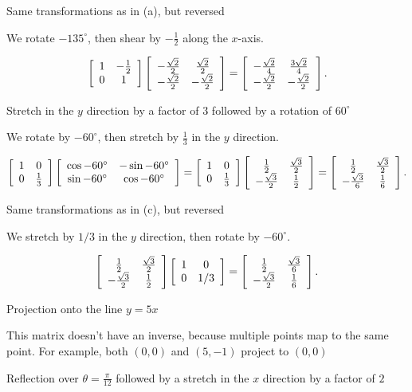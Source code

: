 \documentclass[../key.tex]{subfiles}
\begin{document}
\begin{inner_problem}
\item Same transformations as in (a), but reversed
\end{inner_problem}

We rotate $-135^\circ$, then shear by $-\frac{1}{2}$ along the $x$-axis.

$$\left[\begin{array}{cc} 1 & -\frac{1}{2} \\ 0 & 1 \end{array}\right]\left[\begin{array}{cc} -\frac{\sqrt{2}}{2} & \frac{\sqrt{2}}{2} \\ -\frac{\sqrt{2}}{2} & -\frac{\sqrt{2}}{2} \end{array}\right] = \left[\begin{array}{cc} -\frac{\sqrt{2}}{4} & \frac{3\sqrt{2}}{4} \\ -\frac{\sqrt{2}}{2} & -\frac{\sqrt{2}}{2} \end{array}\right].$$

\begin{inner_problem}
\item Stretch in the $y$ direction by a factor of $3$ followed by a rotation of $60^\circ$
\end{inner_problem}

We rotate by $-60^\circ$, then stretch by $\frac{1}{3}$ in the $y$ direction.

$$\left[\begin{array}{cc} 1 & 0 \\ 0 & \frac{1}{3} \end{array}\right]\left[\begin{array}{cc} \cos -60^\circ & -\sin -60^\circ \\ \sin -60^\circ & \cos -60^\circ \end{array}\right] = \left[\begin{array}{cc} 1 & 0 \\ 0 & \frac{1}{3} \end{array}\right]\left[\begin{array}{cc} \frac{1}{2} & \frac{\sqrt{3}}{2} \\ -\frac{\sqrt{3}}{2} & \frac{1}{2} \end{array}\right] = \left[\begin{array}{cc} \frac{1}{2} & \frac{\sqrt{3}}{2} \\ -\frac{\sqrt{3}}{6} & \frac{1}{6} \end{array}\right].$$

\begin{inner_problem}
\item Same transformations as in (c), but reversed
\end{inner_problem}

We stretch by $1/3$ in the $y$ direction, then rotate by $-60^\circ$.

$$\left[\begin{array}{cc} \frac{1}{2} & \frac{\sqrt{3}}{2} \\ -\frac{\sqrt{3}}{2} & \frac{1}{2} \end{array}\right]\left[\begin{array}{cc} 1 & 0 \\ 0 & 1/3 \end{array}\right] = \left[\begin{array}{cc} \frac{1}{2} & \frac{\sqrt{3}}{6} \\ -\frac{\sqrt{3}}{2} & \frac{1}{6} \end{array}\right].$$

\begin{inner_problem}
\item Projection onto the line $y=5x$
\end{inner_problem}

This matrix doesn't have an inverse, because multiple points map to the same point. For example, both $(0,0)$ and $(5,-1)$ project to $(0,0)$

\begin{inner_problem}
\item Reflection over $\theta=\frac{\pi}{12}$ followed by a stretch in the $x$ direction by a factor of $2$
\end{inner_problem}
\end{document}
